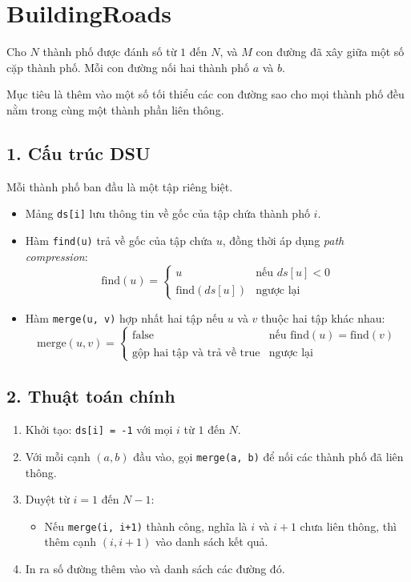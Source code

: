\documentclass{article}
\begin{document}
	
	\section{BuildingRoads}
	
	Cho $N$ thành phố được đánh số từ $1$ đến $N$, và $M$ con đường đã xây giữa một số cặp thành phố. Mỗi con đường nối hai thành phố $a$ và $b$. 
	
	Mục tiêu là thêm vào một số tối thiểu các con đường sao cho mọi thành phố đều nằm trong cùng một thành phần liên thông.
		
	\subsection*{1. Cấu trúc DSU}
	Mỗi thành phố ban đầu là một tập riêng biệt.
	
	\begin{itemize}
		\item Mảng \texttt{ds[i]} lưu thông tin về gốc của tập chứa thành phố $i$.
		\item Hàm \texttt{find(u)} trả về gốc của tập chứa $u$, đồng thời áp dụng \textit{path compression}:
		\[
		\text{find}(u) = 
		\begin{cases}
			u & \text{nếu } ds[u] < 0 \\
			\text{find}(ds[u]) & \text{ngược lại}
		\end{cases}
		\]
		\item Hàm \texttt{merge(u, v)} hợp nhất hai tập nếu $u$ và $v$ thuộc hai tập khác nhau:
		\[
		\text{merge}(u, v) = 
		\begin{cases}
			\text{false} & \text{nếu } \text{find}(u) = \text{find}(v) \\
			\text{gộp hai tập và trả về true} & \text{ngược lại}
		\end{cases}
		\]
	\end{itemize}
	
	\subsection*{2. Thuật toán chính}
	\begin{enumerate}
		\item Khởi tạo: \texttt{ds[i] = -1} với mọi $i$ từ $1$ đến $N$.
		\item Với mỗi cạnh $(a, b)$ đầu vào, gọi \texttt{merge(a, b)} để nối các thành phố đã liên thông.
		\item Duyệt từ $i = 1$ đến $N - 1$:
		\begin{itemize}
			\item Nếu \texttt{merge(i, i+1)} thành công, nghĩa là $i$ và $i+1$ chưa liên thông, thì thêm cạnh $(i, i+1)$ vào danh sách kết quả.
		\end{itemize}
		\item In ra số đường thêm vào và danh sách các đường đó.
	\end{enumerate}
	
\end{document}
